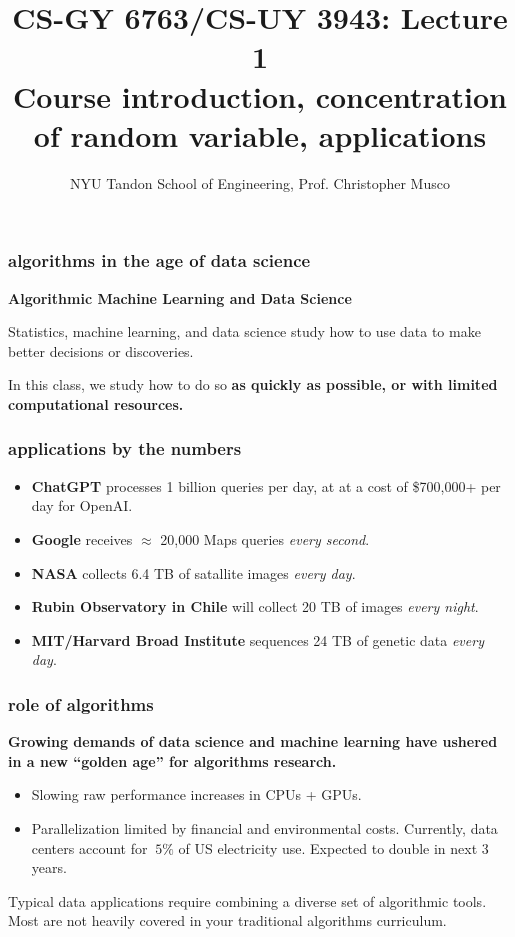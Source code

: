 \documentclass[]{beamer}
\title{CS-GY 6763/CS-UY 3943: Lecture 1 \\ Course introduction, concentration of random variable, applications}
\author{NYU Tandon School of Engineering, Prof. Christopher Musco}
\date{}
\begin{document}
	
	\begin{frame}
		\titlepage 
	\end{frame}
	
	\metroset{titleformat=smallcaps}
	
	\begin{frame}
		\frametitle{algorithms in the age of data science}	
		\begin{center}
			\large\textbf{Algorithmic Machine Learning and Data Science}
			
			Statistics, machine learning, and data science study how to use data to make better decisions or discoveries.
			
			\vspace{1em}
			In this class, we study how to do so \alert{\textbf{as quickly as possible, or with limited computational resources.}}
			
			
		\end{center}
	\end{frame}
	
	\begin{frame}
		\frametitle{applications by the numbers}
		\begin{itemize}
			\item \textbf{ChatGPT} processes 1 billion queries per day, at at a cost of \$700,000+ per day for OpenAI. 
			\item \textbf{Google} receives $\approx$ 20,000 Maps queries \emph{every second}.
			\item \textbf{NASA} collects 6.4 TB of satallite images \emph{every day}. 
			\item \textbf{Rubin Observatory in Chile} will collect 20 TB of images \emph{every night}. 
			\item \textbf{MIT/Harvard Broad Institute} sequences 24 TB of genetic data \emph{every day}. 
		\end{itemize}
	\end{frame}
	
	\begin{frame}
		\frametitle{role of algorithms}
		\textbf{Growing demands of data science and machine learning have ushered in a new ``golden age'' for algorithms research.}
		\begin{itemize}
			\item Slowing raw performance increases in CPUs + GPUs.
			\item Parallelization limited by financial and environmental costs. Currently, data centers account for $~5\%$ of US electricity use. Expected to double in next 3 years. 
		\end{itemize}
		Typical data applications require combining a diverse set of algorithmic tools. Most are not heavily covered in your traditional algorithms curriculum. 
	\end{frame}
	
\end{document}
